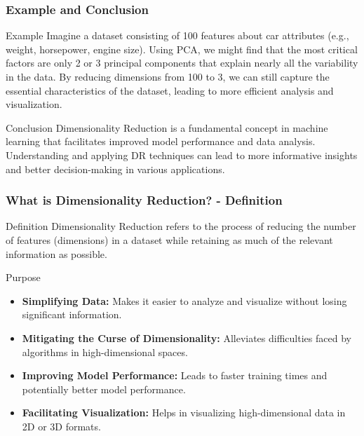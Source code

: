 \documentclass[aspectratio=169]{beamer}
\begin{document}
\begin{frame}[fragile]
    \frametitle{Example and Conclusion}
    \begin{block}{Example}
        Imagine a dataset consisting of 100 features about car attributes (e.g., weight, horsepower, engine size). Using PCA, we might find that the most critical factors are only 2 or 3 principal components that explain nearly all the variability in the data. By reducing dimensions from 100 to 3, we can still capture the essential characteristics of the dataset, leading to more efficient analysis and visualization.
    \end{block}
    
    \begin{block}{Conclusion}
        Dimensionality Reduction is a fundamental concept in machine learning that facilitates improved model performance and data analysis. Understanding and applying DR techniques can lead to more informative insights and better decision-making in various applications.
    \end{block}
\end{frame}

\begin{frame}[fragile]
    \frametitle{What is Dimensionality Reduction? - Definition}
    \begin{block}{Definition}
        Dimensionality Reduction refers to the process of reducing the number of features (dimensions) in a dataset while retaining as much of the relevant information as possible. 
    \end{block}
    \begin{block}{Purpose}
        \begin{itemize}
            \item \textbf{Simplifying Data:} Makes it easier to analyze and visualize without losing significant information.
            \item \textbf{Mitigating the Curse of Dimensionality:} Alleviates difficulties faced by algorithms in high-dimensional spaces.
            \item \textbf{Improving Model Performance:} Leads to faster training times and potentially better model performance.
            \item \textbf{Facilitating Visualization:} Helps in visualizing high-dimensional data in 2D or 3D formats.
        \end{itemize}
    \end{block}
\end{frame}
\end{document}
